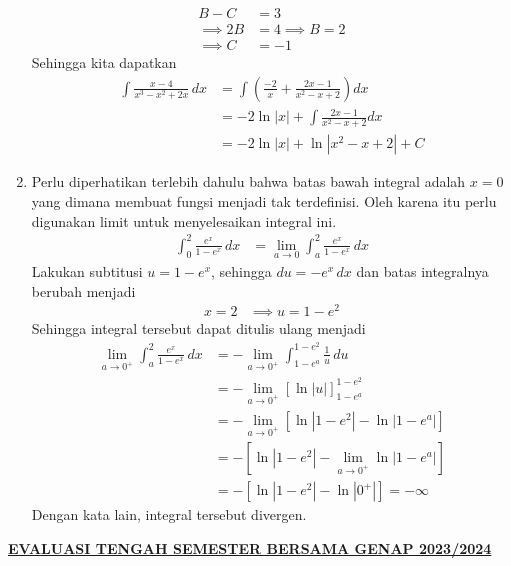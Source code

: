 \documentclass[11pt,openany,a4paper]{article}
\begin{document}
\begin{enumerate}
\begin{align*}
          B - C &= 3 \\
          \implies 2B &= 4 \implies B = 2 \\
          \implies C &= -1
        \end{align*}
        Sehingga kita dapatkan
        \begin{align*}
          \int \frac{x - 4}{x^3 - x^2 + 2x} \, dx &= \int \left(\frac{-2}{x} + \frac{2x - 1}{x^2 - x + 2}\right)dx \\
          &= -2\ln|x| + \int \frac{2x - 1}{x^2 - x + 2}dx \\
          &= \boxed{-2\ln|x| + \ln|x^2 - x + 2| + C}
        \end{align*}

        \item Perlu diperhatikan terlebih dahulu bahwa batas bawah integral adalah $x=0$ yang dimana membuat fungsi menjadi tak terdefinisi. Oleh karena itu perlu digunakan limit untuk menyelesaikan integral ini.
        \begin{align*}
          \int_0^2 \frac{e^x}{1 - e^x} \, dx &= \lim_{a\to 0}\int_a^2 \frac{e^x}{1 - e^x} \, dx
        \end{align*} 
        Lakukan subtitusi $u = 1 - e^x$, sehingga $du = -e^x \, dx$ dan batas integralnya berubah menjadi
        \begin{align*}
          x = 2 &\implies u = 1 - e^2
        \end{align*}
        Sehingga integral tersebut dapat ditulis ulang menjadi
        \begin{align*}
          \lim_{a\to 0^+}\int_a^2 \frac{e^x}{1 - e^x} \, dx &= -\lim_{a\to 0^+}\int_{1 - e^a}^{1 - e^2} \frac{1}{u} \, du \\
          &= -\lim_{a\to 0^+}\left[\ln|u|\right]_{1 - e^a}^{1 - e^2} \\
          &= -\lim_{a\to 0^+}\left[\ln|1 - e^2| - \ln|1 - e^a|\right] \\
          &= -\left[\ln|1 - e^2| - \lim_{a\to 0^+}\ln|1 - e^a|\right] \\
          &= -\left[\ln|1 - e^2| - \ln|0^+|\right] = \boxed{-\infty}
        \end{align*}
        Dengan kata lain, integral tersebut divergen.
    \end{enumerate}

    \newpage
    \pagestyle{problems}
    
    \begin{center}
	{\underline{\textbf{\MakeUppercase{Evaluasi Tengah Semester Bersama Genap 2023/2024}}}}
    \end{center}
\end{document}

